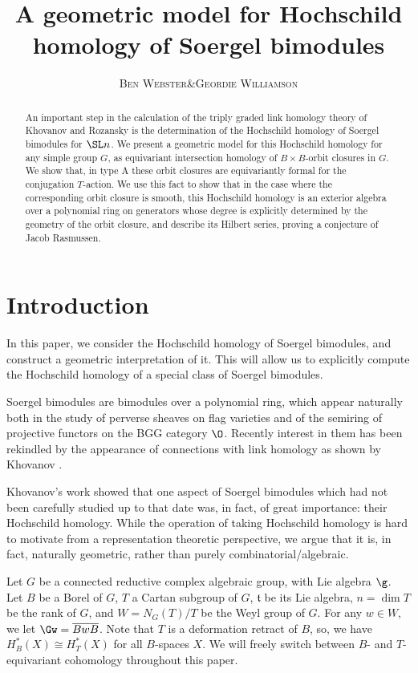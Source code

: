 \documentclass[12pt]{wart}
\title[Hochschild homology of Soergel bimodules]
{A geometric model for Hochschild\\  homology of Soergel bimodules}
\author{\textsc{Ben Webster}&\textsc{Geordie Williamson}}
\theoremstyle{remark}
\begin{document}
\begin{abstract}
  An important step in the calculation of the triply graded link
  homology theory of Khovanov and Rozansky is the determination of
  the Hochschild homology of Soergel bimodules for $\SL n$.  We
  present a geometric model for this Hochschild homology for any
  simple group $G$, as equivariant intersection homology of $B\times
  B$-orbit closures in $G$.  We show that, in type A these orbit
  closures are equivariantly formal for the conjugation $T$-action. We
  use this fact to show that in the case where the corresponding orbit
  closure is smooth, this Hochschild homology is an exterior algebra
  over a polynomial ring on generators whose degree is explicitly
  determined by the geometry of the orbit closure, and describe its
  Hilbert series, proving a conjecture of Jacob Rasmussen.
\end{abstract}
\maketitle

\section{Introduction}
\label{sec:introduction}

In this paper, we consider the Hochschild homology of Soergel
bimodules, and construct a geometric interpretation of it.  This will
allow us to explicitly compute the Hochschild homology of a special
class of Soergel bimodules.

Soergel bimodules are bimodules over a polynomial ring, which appear
naturally both in the study of perverse sheaves on flag varieties and
of the semiring of projective functors on the BGG category $\O$.
Recently interest in them has been rekindled by the appearance of
connections with link homology as shown by Khovanov \cite{Kho05}.

Khovanov's work showed that one aspect of Soergel bimodules which had
not been carefully studied up to that date was, in fact, of great
importance: their Hochschild homology.  While the operation of taking
Hochschild homology is hard to motivate from a representation
theoretic perspective, we argue that it is, in fact, naturally
geometric, rather than purely combinatorial/algebraic.

Let $G$ be a connected reductive complex algebraic group, with Lie
algebra $\g$.
Let $B$ be a Borel of $G$,
$T$ a Cartan subgroup of $G$, $\mathfrak t$ be its Lie algebra, $n=\dim T$ be the rank of $G$, %
and $W=N_G(T)/T$ be the Weyl group of $G$. For any $w\in W$, we let
$\Gw=\overline{BwB}$.  Note that $T$ is a deformation retract of $B$,
so, we have $H^*_B(X)\cong H^*_T(X)$ for all $B$-spaces $X$.  We will
freely switch between $B$- and $T$-equivariant cohomology throughout
this paper.
\end{document}
